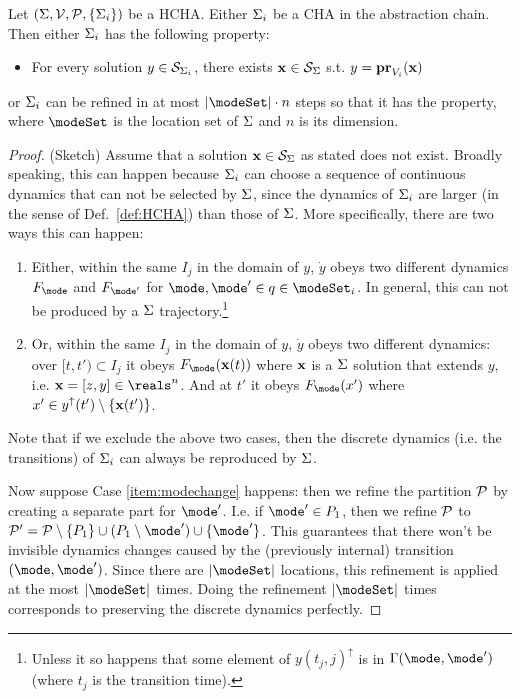 
\begin{thm}
	Let $(\Sigma,\mathcal{V},\mathcal{P},\{\Sigma_i\})$ be a HCHA.
	Either $\Sigma_i$ be a CHA in the abstraction chain.
	Then either $\Sigma_i$ has the following property:
	\begin{itemize}
		\item For every solution $y \in \mathcal{S}_{\Sigma_i}$,
		there exists $\mathbf{x} \in \mathcal{S}_\Sigma$ s.t. $y = {\bf pr}_{V_i}(\mathbf{x})$
	\end{itemize}
	or $\Sigma_i$ can be refined in at most $|\modeSet|\cdot n$ steps so that it has the property, 
	where $\modeSet$ is the location set of $\Sigma$ and $n$ is its dimension.
\end{thm}

\begin{proof} (Sketch)
	Assume that a solution $\mathbf{x} \in \mathcal{S}_\Sigma$ as stated does not exist.
	Broadly speaking, this can happen because $\Sigma_i$ can choose a sequence of continuous dynamics that can not be selected by $\Sigma$, since the dynamics of $\Sigma_i$ are larger (in the sense of Def.~\ref{def:HCHA}) than those of $\Sigma$.
	More specifically, there are two ways this can happen:
	\begin{enumerate}
		\item Either, within the same $I_j$ in the domain of $y$, $\dot{y}$ obeys two different dynamics $F_\mode$ and $F_{\mode'}$ for $\mode,\mode' \in q \in \modeSet_i$.
		In general, this can not be produced by a $\Sigma$ trajectory.\footnote{Unless it so happens that some element of $y(t_j,j)^{\uparrow}$ is in $\guard(\mode,\mode')$ (where $t_j$ is the transition time). }
		\label{item:modechange}
		\item Or, within the same $I_j$ in the domain of $y$, $\dot{y}$ obeys two different dynamics: 
		over $[t,t') \subset I_j$ it obeys $F_\mode(\sttraj(t))$ where $\mathbf{x}$ is a $\Sigma$ solution that extends $y$, i.e. $\sttraj = [z,y] \in \reals^n$.
		And at $t'$ it obeys $F_\mode(x')$ where $x' \in y^\uparrow(t') \setminus \{\mathbf{x}(t')\}$. 
		\label{item:xchange}		
	\end{enumerate}
	
	Note that if we exclude the above two cases, then the discrete dynamics (i.e. the transitions) of $\Sigma_i$ can always be reproduced by $\Sigma$.
	
	Now suppose Case \ref{item:modechange} happens: then we refine the partition $\mathcal{P}$ by creating a separate part for $\mode'$. I.e. if $\mode' \in P_1$, then we refine $\mathcal{P}$ to 
	$\Pc' = \Pc \setminus \{P_1\} \cup (P_1 \setminus \mode') \cup \{\mode'\}$.
	This guarantees that there won't be invisible dynamics changes caused by the (previously internal) transition $(\mode,\mode')$.
	Since there are $|\modeSet|$ locations, this refinement is applied at the most $|\modeSet|$ times.
	Doing the refinement $|\modeSet|$ times corresponds to preserving the discrete dynamics perfectly.
	

\end{proof}
